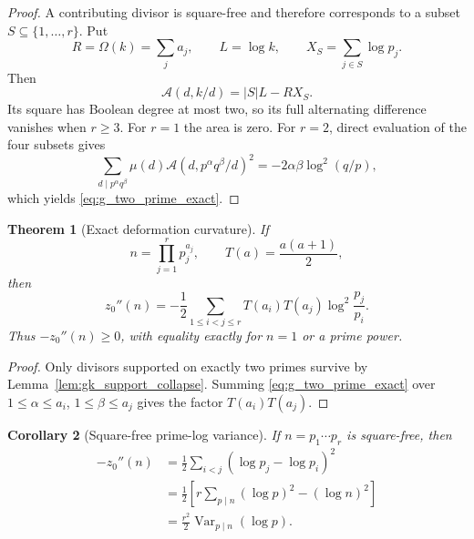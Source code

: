 \documentclass[11pt]{amsart}
\numberwithin{equation}{section}
\theoremstyle{plain}
\newtheorem{theorem}{Theorem}[section]
\newtheorem{corollary}[theorem]{Corollary}
\theoremstyle{definition}
\theoremstyle{remark}
\begin{document}
\begin{proof}
A contributing divisor is square-free and therefore corresponds to a subset
\(S\subseteq\{1,\ldots,r\}\). Put
\begin{equation}
R=\Omega(k)=\sum_j a_j,\qquad L=\log k,
\qquad X_S=\sum_{j\in S}\log p_j.
\label{eq:R_L_XS}
\end{equation}
Then
\begin{equation}
\mathcal A(d,k/d)=|S|L-RX_S.
\label{eq:A_subset_linear}
\end{equation}
Its square has Boolean degree at most two, so its full alternating difference
vanishes when \(r\ge3\). For \(r=1\) the area is zero. For \(r=2\), direct
evaluation of the four subsets gives
\begin{equation}
\sum_{d\mid p^\alpha q^\beta}\mu(d)
\mathcal A(d,p^\alpha q^\beta/d)^2
=-2\alpha\beta\log^2(q/p),
\label{eq:four_term_two_prime_sum}
\end{equation}
which yields \eqref{eq:g_two_prime_exact}.
\end{proof}

\begin{theorem}[Exact deformation curvature]
\label{thm:exact_curvature_formula}
If
\begin{equation}
n=\prod_{j=1}^{r}p_j^{a_j},\qquad T(a)=\frac{a(a+1)}2,
\label{eq:n_factorization_triangular}
\end{equation}
then
\begin{equation}
\boxed{
z_0''(n)=-\frac12\sum_{1\le i<j\le r}
T(a_i)T(a_j)\log^2\!\frac{p_j}{p_i}.}
\label{eq:zsecond_general_formula}
\end{equation}
Thus \(-z_0''(n)\ge0\), with equality exactly for \(n=1\) or a prime
power.
\end{theorem}

\begin{proof}
Only divisors supported on exactly two primes survive by
Lemma~\ref{lem:gk_support_collapse}. Summing
\eqref{eq:g_two_prime_exact} over
\(1\le\alpha\le a_i\), \(1\le\beta\le a_j\) gives the factor
\(T(a_i)T(a_j)\).
\end{proof}

\begin{corollary}[Square-free prime-log variance]
\label{cor:squarefree_prime_variance}
If \(n=p_1\cdots p_r\) is square-free, then
\begin{align}
-z_0''(n)
&=\frac12\sum_{i<j}(\log p_j-\log p_i)^2
\label{eq:squarefree_pair_variance}\\
&=\frac12\left[r\sum_{p\mid n}(\log p)^2-(\log n)^2\right]
\label{eq:squarefree_variance_identity}\\
&=\frac{r^2}{2}\operatorname{Var}_{p\mid n}(\log p).
\label{eq:squarefree_variance_stat}
\end{align}
\end{corollary}
\end{document}

